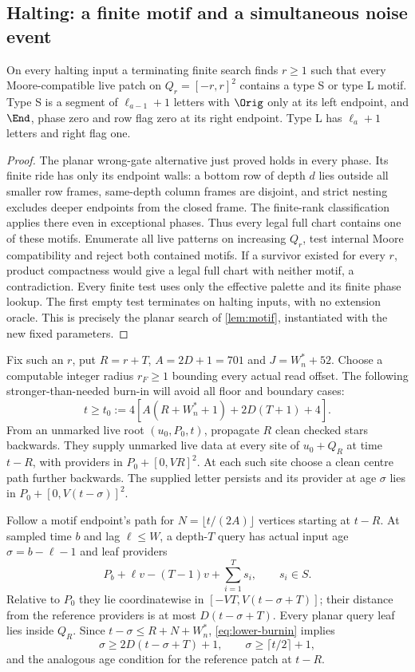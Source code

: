 \subsection{Halting: a finite motif and a simultaneous noise event}

\begin{lemma}\label{lem:lower-motif}
On every halting input a terminating finite search finds $r\ge1$ such that every Moore-compatible live patch on $Q_r=[-r,r]^2$ contains a type S or type L motif. Type S is a segment of $\ell_{a-1}+1$ letters with $\Orig$ only at its left endpoint, and $\End$, phase zero and row flag zero at its right endpoint. Type L has $\ell_a+1$ letters and right flag one.
\end{lemma}
\begin{proof}
The planar wrong-gate alternative just proved holds in every phase. Its finite ride has only its endpoint walls: a bottom row of depth $d$ lies outside all smaller row frames, same-depth column frames are disjoint, and strict nesting excludes deeper endpoints from the closed frame. The finite-rank classification applies there even in exceptional phases. Thus every legal full chart contains one of these motifs. Enumerate all live patterns on increasing $Q_r$, test internal Moore compatibility and reject both contained motifs. If a survivor existed for every $r$, product compactness would give a legal full chart with neither motif, a contradiction. Every finite test uses only the effective palette and its finite phase lookup. The first empty test terminates on halting inputs, with no extension oracle. This is precisely the planar search of \cref{lem:motif}, instantiated with the new fixed parameters.
\end{proof}

Fix such an $r$, put $R=r+T$, $A=2D+1=701$ and $J=W_n^*+52$. Choose a computable integer radius $r_F\ge1$ bounding every actual read offset. The following stronger-than-needed burn-in will avoid all floor and boundary cases:
\[
 t\ge t_0:=4[A(R+W_n^*+1)+2D(T+1)+4].              \tag{L.2}\label{eq:lower-burnin}
\]
From an unmarked live root $(u_0,P_0,t)$, propagate $R$ clean checked stars backwards. They supply unmarked live data at every site of $u_0+Q_R$ at time $t-R$, with providers in $P_0+[0,VR]^2$. At each such site choose a clean centre path further backwards. The supplied letter persists and its provider at age $\sigma$ lies in $P_0+[0,V(t-\sigma)]^2$.

Follow a motif endpoint's path for $N=\lfloor t/(2A)\rfloor$ vertices starting at $t-R$. At sampled time $b$ and lag $\ell\le W$, a depth-$T$ query has actual input age $\sigma=b-\ell-1$ and leaf providers
\[
 P_b+\ell v-(T-1)v+\sum_{i=1}^T s_i,\qquad s_i\in S.
\]
Relative to $P_0$ they lie coordinatewise in $[-VT,V(t-\sigma+T)]$; their distance from the reference providers is at most $D(t-\sigma+T)$. Every planar query leaf lies inside $Q_R$. Since $t-\sigma\le R+N+W_n^*$, \eqref{eq:lower-burnin} implies
\[
 \sigma\ge2D(t-\sigma+T)+1,\qquad \sigma\ge\lceil t/2\rceil+1,
\]
and the analogous age condition for the reference patch at $t-R$.

